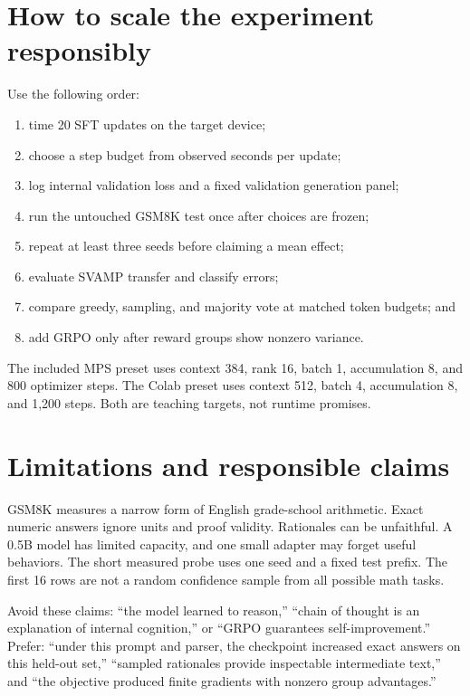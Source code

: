 \documentclass[11pt]{article}
\begin{document}
\section{How to scale the experiment responsibly}
Use the following order:
\begin{enumerate}
\item time 20 SFT updates on the target device;
\item choose a step budget from observed seconds per update;
\item log internal validation loss and a fixed validation generation panel;
\item run the untouched GSM8K test once after choices are frozen;
\item repeat at least three seeds before claiming a mean effect;
\item evaluate SVAMP transfer and classify errors;
\item compare greedy, sampling, and majority vote at matched token budgets; and
\item add GRPO only after reward groups show nonzero variance.
\end{enumerate}
The included MPS preset uses context 384, rank 16, batch 1, accumulation 8, and
800 optimizer steps. The Colab preset uses context 512, batch 4, accumulation 8,
and 1,200 steps. Both are teaching targets, not runtime promises.

\section{Limitations and responsible claims}
GSM8K measures a narrow form of English grade-school arithmetic. Exact numeric
answers ignore units and proof validity. Rationales can be unfaithful. A 0.5B
model has limited capacity, and one small adapter may forget useful behaviors.
The short measured probe uses one seed and a fixed test prefix. The first 16 rows
are not a random confidence sample from all possible math tasks.

Avoid these claims: ``the model learned to reason,'' ``chain of thought is an
explanation of internal cognition,'' or ``GRPO guarantees self-improvement.''
Prefer: ``under this prompt and parser, the checkpoint increased exact answers
on this held-out set,'' ``sampled rationales provide inspectable intermediate
text,'' and ``the objective produced finite gradients with nonzero group
advantages.''
\end{document}
